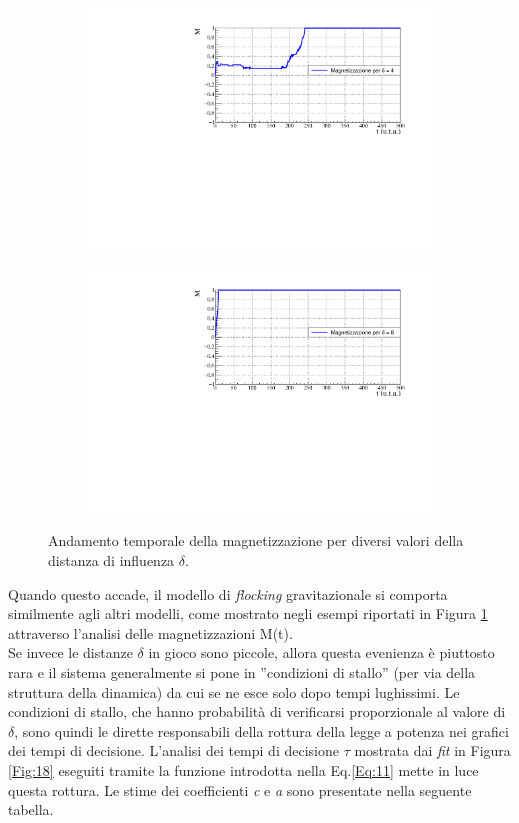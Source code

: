 \documentclass[letterpaper,10pt]{article}
\begin{document}
\begin{figure}[t]
\ContinuedFloat
\centering
\begin{subfigure}{0.95\textwidth}
\centering
\includegraphics[width=0.9\linewidth]{Gravitazione/mag_d4.pdf}
\end{subfigure}
\begin{subfigure}{0.95\textwidth}
\centering
\includegraphics[width=0.9\linewidth]{Gravitazione/mag_d8.pdf}
\end{subfigure}
\label{Fig:17}
\caption{Andamento temporale della magnetizzazione per diversi valori della distanza di influenza $\delta$.}
\end{figure}
Quando questo accade, il modello di \textit{flocking} gravitazionale si comporta similmente agli altri modelli, come mostrato negli esempi riportati in Figura \ref{Fig:17} attraverso l'analisi delle magnetizzazioni M(t). \\
Se invece le distanze $\delta$ in gioco sono piccole, allora questa evenienza è piuttosto rara e il sistema generalmente si pone in ''condizioni di stallo'' (per via della struttura della dinamica) da cui se ne esce solo dopo tempi lughissimi. Le condizioni di stallo, che hanno probabilità di verificarsi proporzionale al valore di $\delta$, sono quindi le dirette responsabili della rottura della legge a potenza nei grafici dei tempi di decisione.  L'analisi dei tempi di decisione $\tau$ mostrata dai \textit{fit} in Figura \ref{Fig:18} eseguiti tramite la funzione introdotta nella Eq.\ref{Eq:11} mette in luce questa rottura. Le stime dei coefficienti \textit{c} e \textit{a} sono presentate nella seguente tabella.
\end{document}
